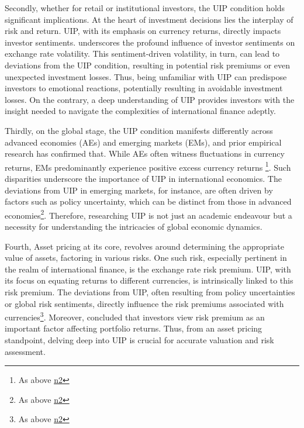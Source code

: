 \documentclass[10pt]{article}
\begin{document}
Secondly, whether for retail or institutional investors, the UIP condition holds significant implications. At the heart of investment decisions lies the interplay of risk and return. UIP, with its emphasis on currency returns, directly impacts investor sentiments. \cite{ur2013investor} underscores the profound influence of investor sentiments on exchange rate volatility. This sentiment-driven volatility, in turn, can lead to deviations from the UIP condition, resulting in potential risk premiums or even unexpected investment losses. Thus, being unfamiliar with UIP can predispose investors to emotional reactions, potentially resulting in avoidable investment losses. On the contrary, a deep understanding of UIP provides investors with the insight needed to navigate the complexities of international finance adeptly.

Thirdly, on the global stage, the UIP condition manifests differently across advanced economies (AEs) and emerging markets (EMs), and prior empirical research has confirmed that. While AEs often witness fluctuations in currency returns, EMs predominantly experience positive excess currency returns \footnote{As above \hyperref[kalemli2021five]{n2}}. Such disparities underscore the importance of UIP in international economics. The deviations from UIP in emerging markets, for instance, are often driven by factors such as policy uncertainty, which can be distinct from those in advanced economies\footnote{As above \hyperref[kalemli2021five]{n2}}. Therefore, researching UIP is not just an academic endeavour but a necessity for understanding the intricacies of global economic dynamics.

Fourth, Asset pricing at its core, revolves around determining the appropriate value of assets, factoring in various risks. One such risk, especially pertinent in the realm of international finance, is the exchange rate risk premium. UIP, with its focus on equating returns to different currencies, is intrinsically linked to this risk premium. The deviations from UIP, often resulting from policy uncertainties or global risk sentiments, directly influence the risk premiums associated with currencies\footnote{As above \hyperref[kalemli2021five]{n2}}. Moreover, \cite{joseph2021pricing} concluded that investors view risk premium as an important factor affecting portfolio returns. Thus, from an asset pricing standpoint, delving deep into UIP is crucial for accurate valuation and risk assessment.
\end{document}
